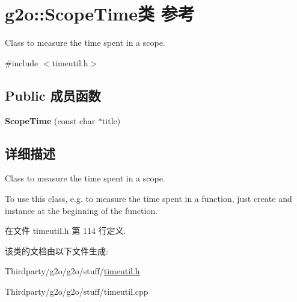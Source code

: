 \hypertarget{classg2o_1_1ScopeTime}{\section{g2o\-:\-:Scope\-Time类 参考}
\label{classg2o_1_1ScopeTime}
}


Class to measure the time spent in a scope.  




{\ttfamily \#include $<$timeutil.\-h$>$}

\subsection*{Public 成员函数}
\begin{DoxyCompactItemize}
\item 
\hypertarget{classg2o_1_1ScopeTime_ae9178f069977b767d21e314aab0c3bf2}{{\bfseries Scope\-Time} (const char $\ast$title)}\label{classg2o_1_1ScopeTime_ae9178f069977b767d21e314aab0c3bf2}

\end{DoxyCompactItemize}


\subsection{详细描述}
Class to measure the time spent in a scope. 

To use this class, e.\-g. to measure the time spent in a function, just create and instance at the beginning of the function. 

在文件 timeutil.\-h 第 114 行定义.



该类的文档由以下文件生成\-:\begin{DoxyCompactItemize}
\item 
Thirdparty/g2o/g2o/stuff/\hyperlink{timeutil_8h}{timeutil.\-h}\item 
Thirdparty/g2o/g2o/stuff/timeutil.\-cpp\end{DoxyCompactItemize}
